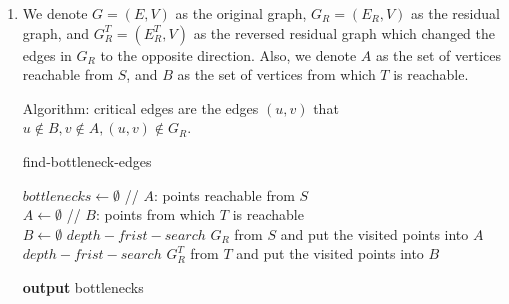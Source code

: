 \documentclass[12pt,a4paper]{article}
\makeatletter
\newtheorem*{solution}{Solution}
\theoremstyle{definition}
\renewenvironment{solution}[1][Solution] {\par\pushQED{\qed}\normalfont\topsep6\p@\@plus6\p@\relax\trivlist\item[\hskip\labelsep\bfseries#1\@addpunct{.}]\ignorespaces}{\popQED\endtrivlist\@endpefalse} \makeatother
\makeatother
\begin{document}
\begin{enumerate}
\begin{enumerate}
\begin{solution}
	We denote $G=(E,V)$ as the original graph, $G_R=(E_R,V)$ as the residual graph, and $G_R^T=(E_R^T,V)$ as the reversed residual graph which changed the edges in $G_R$ to the opposite direction. Also, we denote $A$ as the set of vertices reachable from $S$, and $B$ as the set of vertices from which $T$ is reachable.
	
	Algorithm: critical edges are the edges $(u,v)$ that $u\notin B, v\notin A, (u,v)\notin G_R$.
	
	\begin{minipage}{0.9\textwidth}
		\begin{algorithm}[H]
			\BlankLine
			\caption{find-bottleneck-edges}
			\BlankLine
			
			$bottlenecks\leftarrow\emptyset$\;
			\BlankLine
			// $A$: points reachable from $S$\\
			$A\leftarrow\emptyset$\;
			\BlankLine
			// $B$: points from which $T$ is reachable\\
			$B\leftarrow\emptyset$\;
			\BlankLine
			$depth-frist-search$ $G_R$ from $S$ and put the visited points into $A$\;
			$depth-frist-search$ $G_R^T$ from $T$ and put the visited points into $B$\;
			\BlankLine
			
			\textbf{output} bottlenecks
		\end{algorithm}
	\end{minipage}
\end{solution}
\end{enumerate}
\end{enumerate}
\end{document}
